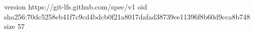 version https://git-lfs.github.com/spec/v1
oid sha256:70dc5258eb41f7c9cd4bdcb0f21a8017dafad38739ee11396f8b60d9cca8b748
size 57
